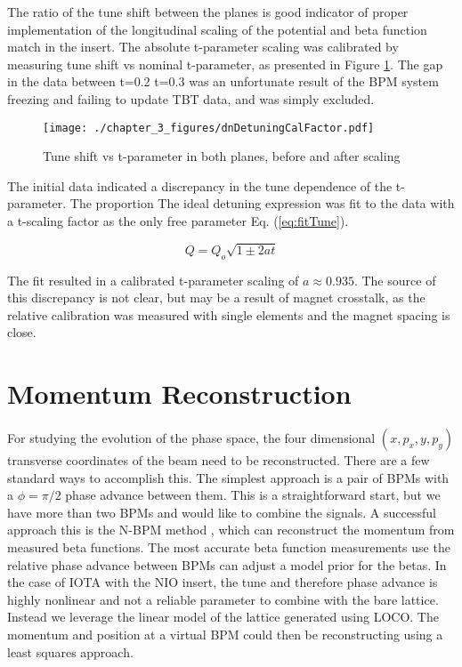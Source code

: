 The ratio of the tune shift between the planes is good indicator of proper implementation of the longitudinal scaling of the potential and beta function match in the insert. The absolute t-parameter scaling was calibrated by measuring tune shift vs nominal t-parameter, as presented in Figure \ref{fig:dnTuneVsT}. The gap in the data between t=0.2 t=0.3 was an unfortunate result of the BPM system freezing and failing to update TBT data, and was simply excluded.

\begin{figure}
    \centering
    \texttt{[image: ./chapter\_3\_figures/dnDetuningCalFactor.pdf]}
    \caption{Tune shift vs t-parameter in both planes, before and after scaling}
    \label{fig:dnTuneVsT}
\end{figure}

The initial data indicated a discrepancy in the tune dependence of the t-parameter. The proportion The ideal detuning expression was fit to the data with a t-scaling factor as the only free parameter Eq. (\ref{eq:fitTune}). 

\begin{equation}
    Q = Q_o \sqrt{1\pm 2at}
    \label{eq:fitTune}
\end{equation}

The fit resulted in a calibrated t-parameter scaling of $a \approx 0.935$. The source of this discrepancy is not clear, but may be a result of magnet crosstalk, as the relative calibration was measured with single elements and the magnet spacing is close.

\section{Momentum Reconstruction} \label{sec:momReconst}
For studying the evolution of the phase space, the four dimensional $(x,p_x,y,p_y)$ transverse coordinates of the beam need to be reconstructed. There are a few standard ways to accomplish this. The simplest approach is a pair of BPMs with a $\phi = \pi/2$ phase advance between them. This is a straightforward start, but we have more than two BPMs and would like to combine the signals. A successful approach this is the N-BPM method \cite{langnerOpticsMeasurementAlgorithms2015}, which can reconstruct the momentum from measured beta functions. The most accurate beta function measurements use the relative phase advance between BPMs can adjust a model prior for the betas. In the case of IOTA with the NIO insert, the tune and therefore phase advance is highly nonlinear and not a reliable parameter to combine with the bare lattice. Instead we leverage the linear model of the lattice generated using LOCO. The momentum and position at a virtual BPM could then be reconstructing using a least squares approach. 

